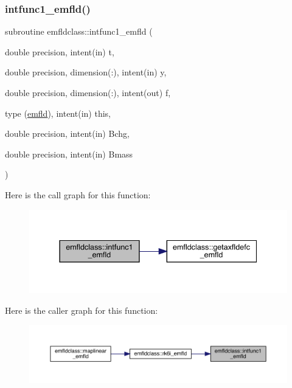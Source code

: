 \subsubsection{\texorpdfstring{intfunc1\_emfld()}{intfunc1\_emfld()}}
{\footnotesize\ttfamily subroutine emfldclass\+::intfunc1\+\_\+emfld (\begin{DoxyParamCaption}\item[{double precision, intent(in)}]{t,  }\item[{double precision, dimension(\+:), intent(in)}]{y,  }\item[{double precision, dimension(\+:), intent(out)}]{f,  }\item[{type (\mbox{\hyperlink{namespaceemfldclass_structemfldclass_1_1emfld}{emfld}}), intent(in)}]{this,  }\item[{double precision, intent(in)}]{Bchg,  }\item[{double precision, intent(in)}]{Bmass }\end{DoxyParamCaption})}

Here is the call graph for this function\+:\nopagebreak
\begin{figure}[H]
\begin{center}
\leavevmode
\includegraphics[width=337pt]{namespaceemfldclass_af90bd5467acb5c62a2d93f6eb1738097_cgraph}
\end{center}
\end{figure}
Here is the caller graph for this function\+:\nopagebreak
\begin{figure}[H]
\begin{center}
\leavevmode
\includegraphics[width=350pt]{namespaceemfldclass_af90bd5467acb5c62a2d93f6eb1738097_icgraph}
\end{center}
\end{figure}
\mbox{\label{namespaceemfldclass_ab283b339abd3df592d8200c244652131}} 
